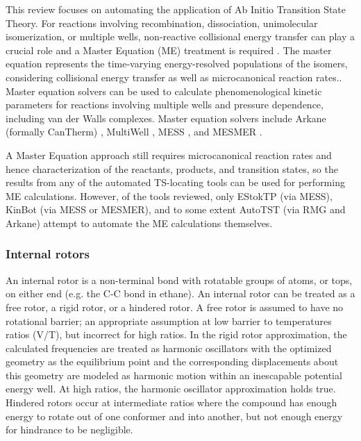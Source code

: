 \documentclass[preprint, 11pt]{elsarticle} %
\begin{document}
This review focuses on automating the application of Ab Initio Transition State Theory.
For reactions involving recombination, dissociation, unimolecular isomerization, or multiple wells,  non-reactive collisional energy transfer can play a crucial role and   a Master Equation (ME) treatment is required \cite{Pilling:2003, truhlar:1996,Pilling:2014Science,Jasper:2014Science}. The master equation represents the time-varying energy-resolved populations of the isomers, considering collisional energy transfer as well as microcanonical reaction rates.\cite{Klippenstein:2017eu}.
Master equation solvers can be used to calculate phenomenological kinetic parameters for reactions involving multiple wells and pressure dependence, including van der Walls complexes.
Master equation solvers include Arkane (formally CanTherm) \cite{gao:2016}, MultiWell
\cite{barker:2001multiwell,multiwell,nguyen:2015}
,  MESS \cite{MESS:2013}, and MESMER \cite{MESMER:2012}.

A Master Equation approach still requires microcanonical reaction rates and hence characterization of the reactants, products, and transition states, so the results from any of the automated TS-locating tools can be used for performing ME calculations. However, of the tools reviewed, only EStokTP (via MESS), KinBot (via MESS or MESMER), and to some extent AutoTST (via RMG and Arkane) attempt to automate the ME calculations themselves.




\subsubsection{Internal rotors}

An internal rotor is a non-terminal bond with rotatable groups of atoms, or tops, on either end (e.g. the C-C bond in ethane). 
An internal rotor can be treated as a free rotor, a rigid rotor, or a hindered rotor.
A free rotor is assumed to have no rotational barrier; an appropriate assumption at low barrier to temperatures ratios (V/T), but incorrect for high ratios.
In the rigid rotor approximation, the calculated frequencies are treated as harmonic oscillators with the optimized geometry as the equilibrium point and the corresponding displacements about this geometry are modeled as harmonic motion within an inescapable potential energy well.
At high ratios, the harmonic oscillator approximation holds true. 
Hindered rotors occur at intermediate ratios where the compound has enough energy to rotate out of one conformer and into another, but not enough energy for hindrance to be negligible.
\end{document}
